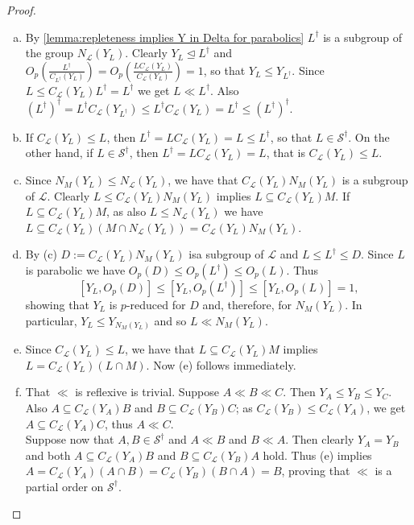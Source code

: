 \documentclass{amsart}
\numberwithin{equation}{section}
\theoremstyle{definition}
\theoremstyle{subresult}
\theoremstyle{caseresult}
\renewcommand{\L}{\mathcal{L}}
\renewcommand{\S}{\mathcal{S}}
\newcommand{\norm}{\trianglelefteq}
\newcommand{\<}{\langle}
\renewcommand{\>}{\rangle}
\begin{document}
\begin{proof}
\begin{enumerate}[(a)]
	\item By \ref{lemma:repleteness implies Y in Delta for parabolics} $L^\dagger$ is a subgroup of the group $N_\L(Y_L)$. Clearly $Y_L \norm L^\dagger$ and $\displaystyle O_p \left( \frac{L^\dagger}{C_{L^\dagger}(Y_L)} \right) = O_p \left( \frac{L C_\L(Y_L)}{C_\L(Y_L)} \right) =1$, so that $Y_L \le Y_{L^\dagger}$. Since $L \le C_\L(Y_L)L^\dagger = L^\dagger$ we get $L \ll L^\dagger$. Also $(L^\dagger)^\dagger = L^\dagger C_\L(Y_{L^\dagger}) \le L^\dagger C_\L(Y_L) = L^\dagger \le (L^\dagger)^\dagger$.
	\item If $C_\L(Y_L) \le L$, then $L^\dagger= L C_\L(Y_L) = L \le L^\dagger$, so that $L \in \S^\dagger$. On the other hand, if $L \in \S^\dagger$, then $L^\dagger= L C_\L(Y_L)=L$, that is $C_\L(Y_L) \le L$.
	\item Since $N_M(Y_L) \le N_\L(Y_L)$, we have that $C_\L(Y_L)N_M(Y_L)$ is a subgroup of $\L$. Clearly $L \le C_\L(Y_L)N_M(Y_L)$ implies $L \subseteq C_\L(Y_L)M$. If $L \subseteq C_\L(Y_L)M$, as also $L \le N_\L(Y_L)$ we have $L \subseteq C_\L(Y_L)(M \cap N_\L(Y_L)) = C_\L(Y_L)N_M(Y_L)$.
	\item By (c) $D:=C_\L(Y_L)N_M(Y_L)$ isa subgroup of $\L$ and $L \le L^\dagger \le D$. Since $L$ is parabolic we have $O_p(D) \le O_p(L^\dagger) \le O_p(L)$. Thus
    \[
        [Y_L,O_p(D)] \le [Y_L,O_p(L^\dagger)] \le [Y_L,O_p(L)] =1,
    \]
    showing that $Y_L$ is $p$-reduced for $D$ and, therefore, for $N_M(Y_L)$. In particular, $Y_L \le Y_{N_M(Y_L)}$ and so $L \ll N_M(Y_L)$.
	\item Since $C_\L(Y_L) \le L$, we have that $L \subseteq C_\L(Y_L)M$ implies $L=C_\L(Y_L)(L \cap M)$. Now (e) follows immediately.
	\item That $\ll$ is reflexive is trivial. Suppose $A \ll B \ll C$. Then $Y_A \le Y_B \le Y_C$. Also $A \subseteq C_\L(Y_A)B$ and $B \subseteq C_\L(Y_B)C$; as $C_\L(Y_B) \le C_\L(Y_A)$, we get $A \subseteq C_\L(Y_A)C$, thus $A \ll C$.\\
	Suppose now that $A,B \in \S^\dagger$ and $A \ll B$ and $B \ll A$. Then clearly $Y_A = Y_B$ and both $A \subseteq C_\L(Y_A)B$ and $B \subseteq C_\L(Y_B)A$ hold. Thus (e) implies $A = C_\L(Y_A)(A \cap B) = C_\L(Y_B)(B \cap A) = B$, proving that $\ll$ is a partial order on $\S^\dagger$.
\end{enumerate}
\end{proof} 
\end{document}
